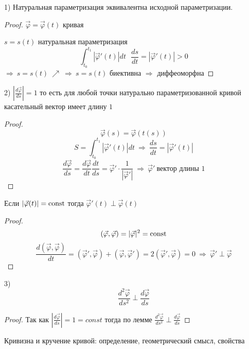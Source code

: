\begin{block}[Свойства]
  1) Натуральная параметризация эквивалентна исходной параметризации.

  \begin{proof}
    $\vec \varphi = \vec \varphi(t)$ кривая

    $s = s(t)$ натуральная параметризация
    $$
    \int_{t_0}^{t_1} |\vec \varphi'(t)| dt ~~~
    \frac{ds}{dt} = |\vec \varphi'(t)| > 0
    $$
    $\Rightarrow ~ s = s(t) ~ \nearrow ~ \Rightarrow ~ s = s(t)$ биективна
    $\Rightarrow$ диффеоморфна
  \end{proof}

  2) $\left| \frac{d \vec \varphi}{ds} \right| = 1$ то есть для любой точки
  натурально параметризованной кривой касательный вектор имеет длину $1$

  \begin{proof}
    $$
    \vec \varphi(s) = \vec \varphi (t(s))
    $$
    $$
    S = \int_{t_0}^{t_1} |\vec \varphi'(t)| dt ~ \Rightarrow ~ \frac{ds}{dt} =
    |\vec \varphi'(t)|
    $$
    $$
    \frac{d\vec \varphi}{ds} = \frac{d \vec \varphi}{dt} \frac{dt}{ds} =
    \vec \varphi' \cdot \frac{1}{|\vec \varphi'|} ~ \Rightarrow ~ \vec \varphi'
    ~ \text{вектор длины 1}
    $$
  \end{proof}

  \begin{block}[Лемма]
    Если $|\vec \varphi(t)| = \mathrm{const}$ тогда $\vec \varphi'(t) \perp
    \vec \varphi(t)$
  \end{block}

  \begin{proof}
    $$
    (\vec \varphi, \vec \varphi) = |\vec \varphi|^2 = \mathrm{const}
    $$
    $$
    \frac{d(\vec \varphi, \vec \varphi)}{dt} = (\vec \varphi', \vec \varphi) +
    (\vec \varphi, \vec \varphi') = 2(\vec \varphi', \vec \varphi) = 0 ~
    \Rightarrow ~ \vec \varphi' \perp \vec \varphi
    $$
  \end{proof}

  3)
  $$
  \frac{d^2 \vec \varphi}{ds^2} \perp \frac{d\vec \varphi}{ds}
  $$
  \begin{proof}
    Так как $\left| \frac{d\vec \varphi}{ds} \right| = 1 = const$ тогда
    по лемме $\frac{d^2 \vec \varphi}{ds^2} \perp \frac{d\vec \varphi}{ds}$
  \end{proof}
\end{block}

\begin{title}[\Large]
  Кривизна и кручение кривой: определение, геометрический смысл, свойства
\end{title}


